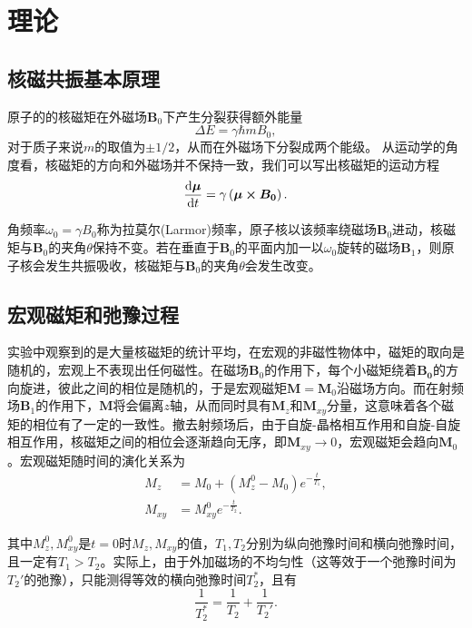 \documentclass[font=default]{mpltx}
\begin{document}
\section{理论\cite{book}}
\subsection{核磁共振基本原理}
  原子的的核磁矩在外磁场$\bm{B}_0$下产生分裂获得额外能量
	\begin{equation}
		\Delta E=\gamma \hbar mB_0,
	\end{equation}
	对于质子来说$m$的取值为$\pm1/2$，从而在外磁场下分裂成两个能级。
	从运动学的角度看，核磁矩的方向和外磁场并不保持一致，我们可以写出核磁矩的运动方程
	\begin{equation}
		\frac{{\rm d} \bm{\mu}}{{\rm d}t}=\gamma\left( \bm{\mu \times \bm{B}_0}\right) .
	\end{equation}
	
	角频率$\omega_0=\gamma B_0$称为拉莫尔(Larmor)频率，原子核以该频率绕磁场$\bm{B}_0$进动，核磁矩与$\bm{B}_0$的夹角$\theta$保持不变。若在垂直于$\bm{B}_0$的平面内加一以$\omega_0$旋转的磁场$\bm{B}_1$，则原子核会发生共振吸收，核磁矩与$\bm{B}_0$的夹角$\theta$会发生改变。
\subsection{宏观磁矩和弛豫过程}
  实验中观察到的是大量核磁矩的统计平均，在宏观的非磁性物体中，磁矩的取向是随机的，宏观上不表现出任何磁性。在磁场$\bm{B}_0$的作用下，每个小磁矩绕着$\bm{B_0}$的方向旋进，彼此之间的相位是随机的，于是宏观磁矩$\bm{M}=\bm{M}_0$沿磁场方向。而在射频场$\bm{B}_1$的作用下，$\bm{M}$将会偏离$z$轴，从而同时具有$\bm{M}_z$和$\bm{M}_{xy}$分量，这意味着各个磁矩的相位有了一定的一致性。撤去射频场后，由于自旋-晶格相互作用和自旋-自旋相互作用，核磁矩之间的相位会逐渐趋向无序，即$\bm{M}_{xy}\to 0$，宏观磁矩会趋向$\bm{M}_0$。宏观磁矩随时间的演化关系为
	\begin{equation}
    \begin{aligned}
      M_z&=M_0+\left( M_z^0-M_0\right) e^{-\frac{t}{T_1}},\\
		  M_{xy}&=M_{xy}^0e^{-\frac{t}{T_2}}.
    \end{aligned}
	\end{equation}
	
	其中$M_z^0,M_{xy}^0$是$t=0$时$M_z,M_{xy}$的值，$T_1,T_2$分别为纵向弛豫时间和横向弛豫时间，且一定有$T_1>T_2$。实际上，由于外加磁场的不均匀性（这等效于一个弛豫时间为$T_2'$的弛豫），只能测得等效的横向弛豫时间$T_2^*$，且有
	\begin{equation}
		\frac{1}{T_2^*}=\frac{1}{T_2}+\frac{1}{T_2'}.
	\end{equation}
\end{document}
